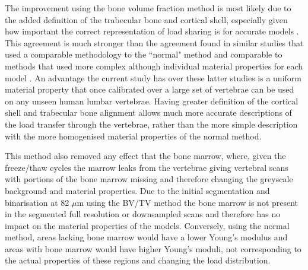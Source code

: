 The improvement using the bone volume fraction method is most likely due to the
added definition of the trabecular bone and cortical shell, especially given
how important the correct representation of load sharing is for accurate models
\cite{eswaran2006cortical}. This agreement is much stronger than the agreement
found in similar studies that used a comparable methodology to the ``normal"
method \cite{Wijayathunga2008, zapata2017methodology, RobsonBrown2014} and
comparable to methods that used more complex although individual material
properties for each model \cite{Kinzl2012,kinzl2013experimentally}. An
advantage the current study has over these latter studies is a uniform material
property that once calibrated over a large set of vertebrae can be used on any
unseen human lumbar vertebrae. Having greater definition of the cortical shell
and trabecular bone alignment allows much more accurate descriptions of the
load transfer through the vertebrae, rather than the more simple description
with the more homogenised material properties of the normal method.

This method also removed any effect that the bone marrow, where, given the
freeze/thaw cycles the marrow leaks from the vertebrae giving vertebral scans
with portions of the bone marrow missing and therefore changing the greyscale
background and material properties.  Due to the initial segmentation and
binarisation at 82 $\mu$m using the BV/TV method the bone marrow is not present
in the segmented full resolution or downsampled scans and therefore has no
impact on the material properties of the models.  Conversely, using the normal
method, areas lacking bone marrow would have a lower Young's modulus and areas
with bone marrow would have higher Young's moduli, not corresponding to the
actual properties of these regions and changing the load distribution.

